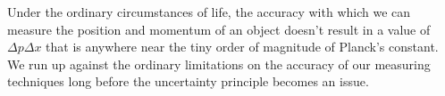 Under the ordinary circumstances of life, the accuracy with which we can measure the position
and momentum of an object doesn't result in a value of $\Delta p \Delta x$ that is anywhere
near the tiny order of magnitude of Planck's constant. We run up against the ordinary
limitations on the accuracy of our measuring techniques long before the uncertainty principle
becomes an issue.




